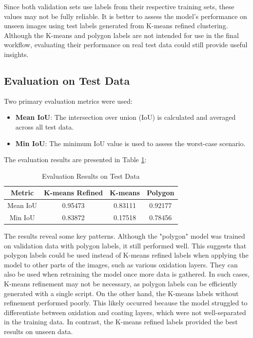 Since both validation sets use labels from their respective training sets, these values may not be fully reliable. It is better to assess the model’s performance on unseen images using test labels generated from K-means refined clustering. Although the K-means and polygon labels are not intended for use in the final workflow, evaluating their performance on real test data could still provide useful insights.

\subsection{Evaluation on Test Data}

Two primary evaluation metrics were used:

\begin{itemize}
    \item \textbf{Mean IoU}: The intersection over union (IoU) is calculated and averaged across all test data.
    \item \textbf{Min IoU}: The minimum IoU value is used to assess the worst-case scenario.
\end{itemize}

The evaluation results are presented in Table \ref{tab:test_results}:

\begin{table}[ht]
\centering
\renewcommand{\arraystretch}{1.2}
\begin{tabular}{|c|c|c|c|}
\hline
\textbf{Metric} & \textbf{K-means Refined} & \textbf{K-means} & \textbf{Polygon} \\
\hline
Mean IoU & 0.95473 & 0.83111 & 0.92177 \\
Min IoU & 0.83872 & 0.17518 & 0.78456 \\
\hline
\end{tabular}
\caption{Evaluation Results on Test Data}
\label{tab:test_results}
\end{table}

The results reveal some key patterns. Although the "polygon" model was trained on validation data with polygon labels, it still performed well. This suggests that polygon labels could be used instead of K-means refined labels when applying the model to other parts of the images, such as various oxidation layers. They can also be used when retraining the model once more data is gathered. In such cases, K-means refinement may not be necessary, as polygon labels can be efficiently generated with a single script. On the other hand, the K-means labels without refinement performed poorly. This likely occurred because the model struggled to differentiate between oxidation and coating layers, which were not well-separated in the training data. In contrast, the K-means refined labels provided the best results on unseen data.

